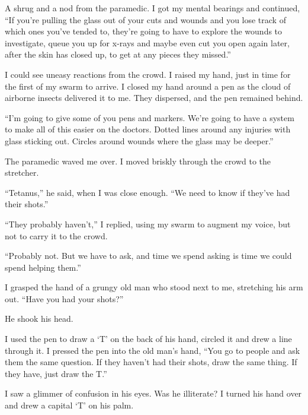 A shrug and a nod from the paramedic.  I got my mental bearings and continued, ``If you're pulling the glass out of your cuts and wounds and you lose track of which ones you've tended to, they're going to have to explore the wounds to investigate, queue you up for x-rays and maybe even cut you open again later, after the skin has closed up, to get at any pieces they missed.''



I could see uneasy reactions from the crowd.  I raised my hand, just in time for the first of my swarm to arrive.  I closed my hand around a pen as the cloud of airborne insects delivered it to me.  They dispersed, and the pen remained behind.



``I'm going to give some of you pens and markers.  We're going to have a system to make all of this easier on the doctors.  Dotted lines around any injuries with glass sticking out.  Circles around wounds where the glass may be deeper.''



The paramedic waved me over.  I moved briskly through the crowd to the stretcher.



``Tetanus,'' he said, when I was close enough.  ``We need to know if they've had their shots.''



``They probably haven't,'' I replied, using my swarm to augment my voice, but not to carry it to the crowd.



``Probably not.  But we have to ask, and time we spend asking is time we could spend helping them.''



I grasped the hand of a grungy old man who stood next to me, stretching his arm out.  ``Have you had your shots?''



He shook his head.



I used the pen to draw a `T' on the back of his hand, circled it and drew a line through it.  I pressed the pen into the old man's hand, ``You go to people and ask them the same question.  If they haven't had their shots, draw the same thing.  If they have, just draw the T.''



I saw a glimmer of confusion in his eyes.  Was he illiterate?  I turned his hand over and drew a capital `T' on his palm.



